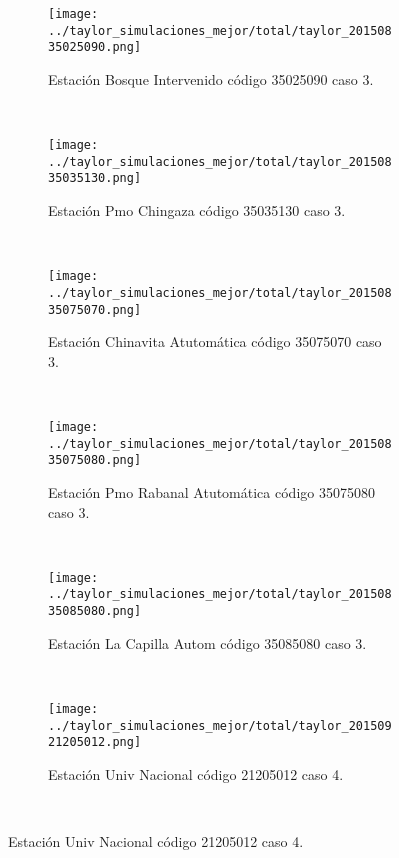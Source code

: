 \begin{figure}[H]\ContinuedFloat
\centering
\begin{subfigure}[normla]{0.4\textwidth}
\texttt{[image: ../taylor\_simulaciones\_mejor/total/taylor\_20150835025090.png]}
\caption{Estación Bosque Intervenido código 35025090 caso 3.}
\end{subfigure}
~
\begin{subfigure}[normla]{0.4\textwidth}
\texttt{[image: ../taylor\_simulaciones\_mejor/total/taylor\_20150835035130.png]}
\caption{Estación Pmo Chingaza código 35035130 caso 3.}
\end{subfigure}
~
\begin{subfigure}[normla]{0.4\textwidth}
\texttt{[image: ../taylor\_simulaciones\_mejor/total/taylor\_20150835075070.png]}
\caption{Estación Chinavita Atutomática código 35075070 caso 3.}
\end{subfigure}
~
\begin{subfigure}[normla]{0.4\textwidth}
\texttt{[image: ../taylor\_simulaciones\_mejor/total/taylor\_20150835075080.png]}
\caption{Estación Pmo Rabanal Atutomática código 35075080 caso 3.}
\end{subfigure}
~
\begin{subfigure}[normla]{0.4\textwidth}
\texttt{[image: ../taylor\_simulaciones\_mejor/total/taylor\_20150835085080.png]}
\caption{Estación La Capilla Autom código 35085080 caso 3.}
\end{subfigure}
~
\begin{subfigure}[normla]{0.4\textwidth}
\texttt{[image: ../taylor\_simulaciones\_mejor/total/taylor\_20150921205012.png]}
\caption{Estación Univ Nacional código 21205012 caso 4.}
\end{subfigure}
~
\end{figure}
 
